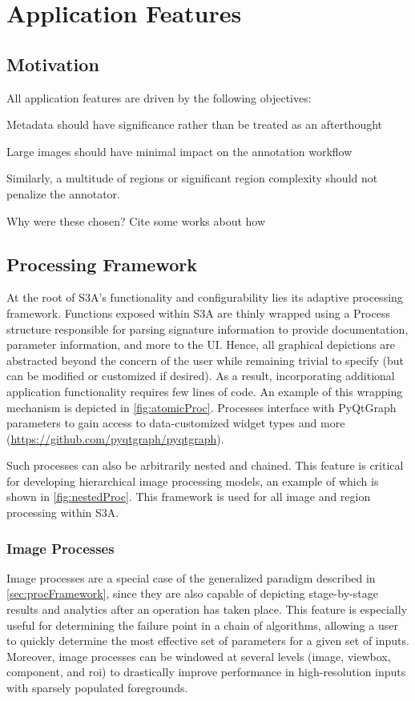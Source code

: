 \section{Application Features}

\subsection{Motivation}\label{sec:motivation}
All application features are driven by the following objectives:

Metadata should have significance rather than be treated as an afterthought

Large images should have minimal impact on the annotation workflow

Similarly, a multitude of regions or significant region complexity should not penalize the annotator.

Why were these chosen? Cite some works about how 

\subsection{Processing Framework}\label{sec:procFramework}
At the root of S3A's functionality and configurability lies its adaptive processing framework. Functions exposed within S3A are thinly wrapped using a Process structure responsible for parsing signature information to provide documentation, parameter information, and more to the UI. Hence, all graphical depictions are abstracted beyond the concern of the user while remaining trivial to specify (but can be modified or customized if desired). As a result, incorporating additional application functionality requires few lines of code. An example of this wrapping mechanism is depicted in \autoref{fig:atomicProc}. Processes interface with PyQtGraph parameters to gain access to data-customized widget types and more (\href{https://github.com/pyqtgraph/pyqtgraph}{https://github.com/pyqtgraph/pyqtgraph}).

\makeAtomicProcFig

Such processes can also be arbitrarily nested and chained. This feature is critical for developing hierarchical image processing models, an example of which is shown in \autoref{fig:nestedProc}. This framework is used for all image and region processing within S3A.

\makeNestedProcFig

\subsubsection{Image Processes}
Image processes are a special case of the generalized paradigm described in \autoref{sec:procFramework}, since they are also capable of depicting stage-by-stage results and analytics after an operation has taken place. This feature is especially useful for determining the failure point in a chain of algorithms, allowing a user to quickly determine the most effective set of parameters for a given set of inputs. Moreover, image processes can be windowed at several levels (image, viewbox, component, and roi) to drastically improve performance in high-resolution inputs with sparsely populated foregrounds.



